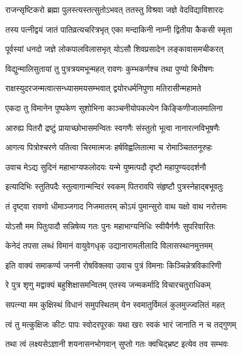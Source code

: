 \twolineshloka
{राजन्सृष्टिकरो ब्रह्मा पुलस्त्यस्तत्सुतोऽभवत्}
{ततस्तु विश्रवा जज्ञे वेदविद्याविशारदः}%

\twolineshloka
{तस्य पत्नीद्वयं जातं पातिव्रत्यचरित्रभृत्}
{एका मन्दाकिनी नाम्नी द्वितीया कैकसी स्मृता}%

\twolineshloka
{पूर्वस्यां धनदो जज्ञे लोकपालविलासभृत्}
{योऽसौ शिवप्रसादेन लङ्कावासमचीकरत्}%

\twolineshloka
{विद्युन्मालिसुतायां तु पुत्रत्रयमभून्महत्}
{रावणः कुम्भकर्णश्च तथा पुण्यो बिभीषणः}%

\twolineshloka
{राक्षस्युदरजन्मत्वात्सन्ध्यासमयसम्भवात्}
{द्वयोरधर्मनिपुणा मतिरासीन्महामते}%

\twolineshloka
{एकदा तु विमानेन पुष्पकेण सुशोभिना}
{काञ्चनीयोपकल्पेन किङ्किणीजालमालिना}%

\twolineshloka
{आरुह्य पितरौ द्रष्टुं प्रायाच्छोभासमन्वितः}
{स्वगणैः संस्तुतो भूत्वा नानारत्नविभूषणैः}%

\twolineshloka
{आगत्य पित्रोश्चरणे पतित्वा चिरमात्मजः}
{हर्षविह्वलितात्मा च रोमाञ्चिततनूरुहः}%

\twolineshloka
{उवाच मेऽद्य सुदिनं महाभाग्यफलोदयः}
{यन्मे युष्मत्पदौ दृष्टौ महापुण्यददर्शनौ}%

\twolineshloka
{इत्यादिभिः स्तुतिपदैः स्तुत्वागान्मन्दिरं स्वकम्}
{पितरावपि संहृष्टौ पुत्रस्नेहाद्बभूवतुः}%

\twolineshloka
{तं दृष्ट्वा रावणो धीमाञ्जगाद निजमातरम्}
{कोऽयं पुमान्सुरो वाथ यक्षो वाथ नरोत्तमः}%

\twolineshloka
{योऽसौ मम पितुःपादौ सन्निषेव्य गतः पुनः}
{महाभाग्यनिधिः स्वीयैर्गणैः सुपरिवारितः}%

\twolineshloka
{केनेदं तपसा लब्धं विमानं वायुवेगधृक्}
{उद्यानारामलीलादि विलासस्थानमुत्तमम्}%


\twolineshloka
{इति वाक्यं समाकर्ण्य जननी रोषविक्लवा}
{उवाच पुत्रं विमनाः किञ्चिन्नेत्रविकारिणी}%

\twolineshloka
{रे पुत्र शृणु मद्वाक्यं बहुशिक्षासमन्वितम्}
{एतस्य जन्मकर्मादि विचारचतुराधिकम्}%

\twolineshloka
{सपत्न्या मम कुक्षिस्थं विधानं समुपस्थितम्}
{येन स्वमातुर्विमलं कुलमुज्ज्वलितं महत्}%

\twolineshloka
{त्वं तु मत्कुक्षिजः कीटः पापः स्वोदरपूरकः}
{यथा खरः स्वकं भारं जानाति न च तद्गुणम्}%

\twolineshloka
{तथा त्वं लक्ष्यसेऽज्ञानी शयनासनभोगवान्}
{सुप्तो गतः क्वचिद्भ्रष्ट इत्येव तव सम्भवः}%


